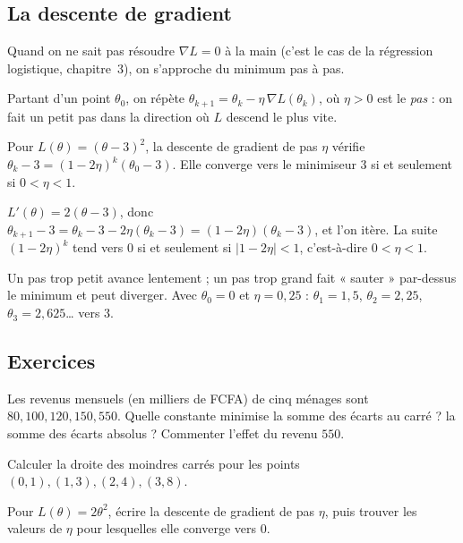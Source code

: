 \subsection{La descente de gradient}

Quand on ne sait pas résoudre $\nabla L=0$ à la main (c'est le cas de la régression logistique, chapitre~3), on s'approche du minimum pas à pas.

\begin{definition}
Partant d'un point $\theta_0$, on répète $\theta_{k+1}=\theta_k-\eta\,\nabla L(\theta_k)$, où $\eta>0$ est le \emph{pas} : on fait un petit pas dans la direction où $L$ descend le plus vite.
\end{definition}

\begin{proposition}
\label{prop:gd}
Pour $L(\theta)=(\theta-3)^2$, la descente de gradient de pas $\eta$ vérifie $\theta_k-3=(1-2\eta)^k(\theta_0-3)$.
Elle converge vers le minimiseur $3$ si et seulement si $0<\eta<1$.
\end{proposition}
\begin{preuve}
$L'(\theta)=2(\theta-3)$, donc $\theta_{k+1}-3=\theta_k-3-2\eta(\theta_k-3)=(1-2\eta)(\theta_k-3)$, et l'on itère.
La suite $(1-2\eta)^k$ tend vers $0$ si et seulement si $|1-2\eta|<1$, c'est-à-dire $0<\eta<1$.
\end{preuve}

\begin{remarque}[Lecture]
Un pas trop petit avance lentement ; un pas trop grand fait « sauter » par-dessus le minimum et peut diverger. Avec $\theta_0=0$ et $\eta=0{,}25$ : $\theta_1=1{,}5$, $\theta_2=2{,}25$, $\theta_3=2{,}625$\dots{} vers $3$.
\end{remarque}

\subsection*{Exercices}

\begin{exercice}
\label{ex:constante}
Les revenus mensuels (en milliers de FCFA) de cinq ménages sont $80,100,120,150,550$.
Quelle constante minimise la somme des écarts au carré ? la somme des écarts absolus ? Commenter l'effet du revenu $550$.
\end{exercice}

\begin{exercice}
\label{ex:droite}
Calculer la droite des moindres carrés pour les points $(0,1),(1,3),(2,4),(3,8)$.
\end{exercice}

\begin{exercice}
\label{ex:gd}
Pour $L(\theta)=2\theta^2$, écrire la descente de gradient de pas $\eta$, puis trouver les valeurs de $\eta$ pour lesquelles elle converge vers $0$.
\end{exercice}
